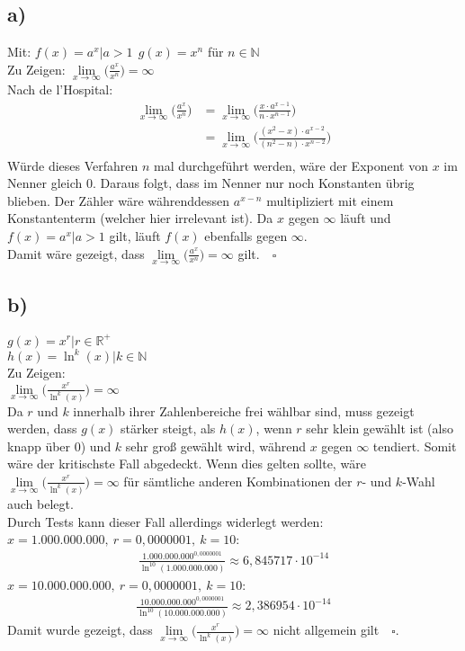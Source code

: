\documentclass[a4paper]{scrartcl}
\newcommand{\qed}{\quad \square}
\begin{document}
\subsection{a)}
Mit: \(f(x)=a^x |a>1\ \ g(x)=x^n\) für \(n\in \mathbb{N}\)\\
Zu Zeigen: \(\lim\limits_{x\to\infty}\bigg(\frac{a^x}{x^n}\bigg)=\infty\)\\
Nach de l'Hospital:
\begin{align}
\lim\limits_{x\to\infty}\bigg(\frac{a^x}{x^n}\bigg)&=\lim\limits_{x\to\infty}\bigg(\frac{x\cdot a^{x-1}}{n\cdot x^{n-1}}\bigg)\\
	&=\lim\limits_{x\to\infty}\bigg(\frac{(x^2-x)\cdot a^{x-2}}{(n^2-n)\cdot x^{n-2}}\bigg)\\
\end{align}
Würde dieses Verfahren \(n\) mal durchgeführt werden, wäre der Exponent von \(x\) im Nenner gleich 0. Daraus folgt, dass im Nenner nur noch Konstanten übrig blieben. Der Zähler wäre währenddessen \(a^{x-n}\) multipliziert mit einem Konstantenterm (welcher hier irrelevant ist). Da \(x\) gegen  \(\infty\) läuft und \(f(x)=a^x|a>1\) gilt, läuft \(f(x)\) ebenfalls gegen \(\infty\).\\
Damit wäre gezeigt, dass \(\lim\limits_{x\to\infty}\bigg(\frac{a^x}{x^n}\bigg)=\infty\) gilt.\(\qed\)
\subsection{b)}
\(g(x)=x^r|r\in\mathbb{R^+}\)\\
\(h(x)=\ln ^k(x)|k\in\mathbb{N}\)\\
Zu Zeigen:\\
\(\lim\limits_{x\to\infty}\bigg(\frac{x^r}{\ln ^k(x)}\bigg)=\infty\)\\
Da \(r\) und \(k\) innerhalb ihrer Zahlenbereiche frei wählbar sind, muss gezeigt werden, dass \(g(x)\) stärker steigt, als \(h(x)\), wenn \(r\) sehr klein gewählt ist (also knapp über 0) und \(k\) sehr groß gewählt wird, während \(x\) gegen \(\infty\) tendiert. Somit wäre der kritischste Fall abgedeckt. Wenn dies gelten sollte, wäre \(\lim\limits_{x\to\infty}\bigg(\frac{x^r}{\ln ^k(x)}\bigg)=\infty\) für sämtliche anderen Kombinationen der \(r\)- und \(k\)-Wahl auch belegt.\\
Durch Tests kann dieser Fall allerdings widerlegt werden:\\
\(x=1.000.000.000,\ r=0,0000001,\ k=10\):
\begin{align}
\frac{1.000.000.000^{0,0000001}}{\ln ^{10}(1.000.000.000)}\approx 6,845717\cdot 10^{-14}
\end{align}
\(x=10.000.000.000,\ r=0,0000001,\ k=10\):
\begin{align}
\frac{10.000.000.000^{0,0000001}}{\ln ^{10}(10.000.000.000)}\approx 2,386954\cdot 10^{-14}
\end{align}
Damit wurde gezeigt, dass \(\lim\limits_{x\to\infty}\bigg(\frac{x^r}{\ln ^k(x)}\bigg)=\infty\) nicht allgemein gilt\(\qed\).
\end{document}
